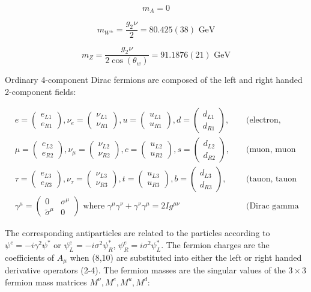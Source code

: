 \documentclass[12pt,a4paper,pagesize=pdftex]{scrartcl}
\newcommand{\icol}[1]{%
  \left(\begin{smallmatrix}#1\end{smallmatrix}\right)%
}
\begin{document}
\begin{equation*}
	m_A=0
\end{equation*}

\begin{equation*}
	m_{W^\pm}=\frac{g_2\nu}{2}=80.425(38)\text{ GeV}
\end{equation*}

\begin{equation*}
	m_Z=\frac{g_2\nu}{2\cos\left(\theta_w\right)}=91.1876(21)\text{ GeV}
\end{equation*}

Ordinary 4-component Dirac fermions are composed of the left and right handed 2-component fields:

\begin{align*}
	&e=\icol{e_{L1}\\e_{R1}},\nu_e=\icol{\nu_{L1}\\\nu_{R1}}, u=\icol{u_{L1}\\u_{R1}},d=\icol{d_{L1}\\d_{R1}},&&\text{ (electron, electron neutrino, up and down quark)}\\
	&\mu=\icol{e_{L2}\\e_{R2}},\nu_\mu=\icol{\nu_{L2}\\\nu_{R2}},c=\icol{u_{L2}\\u_{R2}},s=\icol{d_{L2}\\d_{R2}},&&\text{ (muon, muon neutrino, charm, and strange quark)}\\
	&\tau=\icol{e_{L3}\\e_{R3}},\nu_\tau=\icol{\nu_{L3}\\\nu_{R3}},t=\icol{u_{L3}\\u_{R3}},b=\icol{d_{L3}\\d_{R3}},&&\text{ (tauon, tauon neutrino, top and bottom quark)}\\
	&\gamma^\mu=\left(\begin{smallmatrix}0&\sigma^\mu\\\tilde{\sigma}^\mu&0\end{smallmatrix}\right)\text{ where }\gamma^\mu\gamma^\nu+\gamma^\nu\gamma^\mu=2Ig^{\mu\nu}&&\text{ (Dirac gamma matrices in chiral representation)}
\end{align*}

The corresponding antiparticles are related to the particles according to $\psi^e=-i\gamma^2\psi^*$ or $\psi_L^e=-i\sigma^2\psi^*_R$, $\psi_R^e=i\sigma^2\psi_L^*$. The fermion charges are the coefficients of $A_\mu$ when (8,10) are substituted into either the left or right handed derivative operators (2-4). The fermion masses are the singular values of the $3\times3$ fermion mass matrices $M^\nu, M^e, M^u, M^d$:
\end{document}
